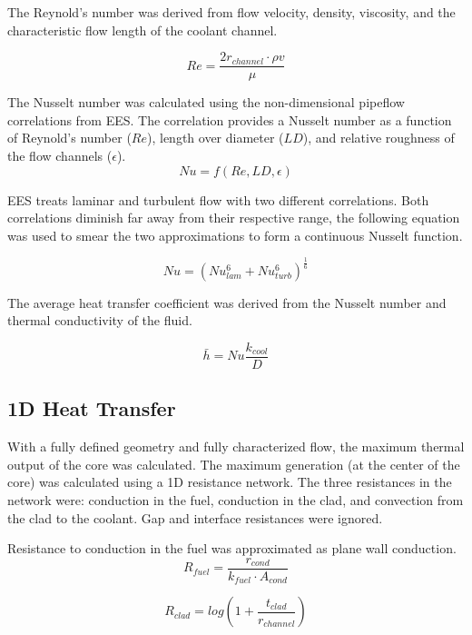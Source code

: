 The Reynold's number was derived from flow velocity, density, viscosity, and the
characteristic flow length of the coolant channel.

\begin{equation}
    Re = \frac{2r_{channel}\cdot \rho v }{\mu}
\end{equation}

The Nusselt number was calculated using the non-dimensional pipeflow
correlations from EES. The correlation provides a Nusselt number as a function
of Reynold's number ($Re$), length over diameter ($LD$), and relative roughness
of the flow channels ($\epsilon$).
\begin{equation}
    Nu = f(Re, LD, \epsilon)
\end{equation}

EES treats laminar and turbulent flow with two different correlations. 
Both correlations diminish far away from their respective
range, the following equation was used to smear the two approximations to form a
continuous Nusselt function.

\begin{equation}
    Nu = (Nu_{lam}^6 + Nu_{turb}^6)^{\frac{1}{6}}
\end{equation}

The average heat transfer coefficient was derived from the Nusselt number and
thermal conductivity of the fluid.

\begin{equation}
    \bar{h} = Nu \frac{k_{cool}}{D}
\end{equation}

\subsection{1D Heat Transfer}

With a fully defined geometry and fully characterized flow, the maximum thermal
output of the core was calculated. The maximum generation (at the center of the
core) was calculated using a 1D resistance network. The three resistances in the
network were: conduction in the fuel, conduction in the clad, and convection from
the clad to the coolant. Gap and interface resistances were ignored.

Resistance to conduction in the fuel was approximated as plane wall conduction.
\begin{equation}
    R_{fuel} =  \frac{r_{cond}}{k_{fuel}\cdot A_{cond}}
\end{equation}

\begin{equation}
    R_{clad} = log(1+\frac{t_{clad}}{r_{channel}})
\end{equation}

